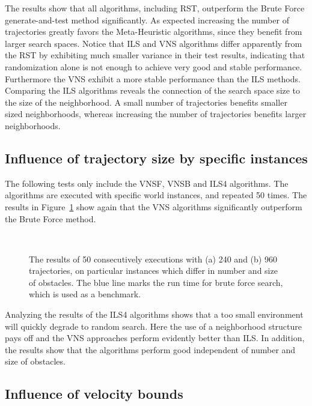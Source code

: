  
The results show that all algorithms, including RST, outperform the Brute Force generate-and-test method significantly. 
As expected increasing the number of trajectories greatly favors the Meta-Heuristic algorithms, since they benefit from larger search spaces. 
Notice that ILS and VNS algorithms differ apparently from the RST by exhibiting much smaller variance in their test results, indicating that randomization alone is not enough to achieve very good and stable performance.
Furthermore the VNS exhibit a more stable performance than the ILS methods. 
Comparing the ILS algorithms reveals the connection of the search space size to the size of the neighborhood. 
A small number of trajectories benefits smaller sized neighborhoods, whereas increasing the number of trajectories benefits larger neighborhoods. 

\subsection{Influence of trajectory size by specific instances}
The following tests only include the VNSF, VNSB and ILS4 algorithms. 
The algorithms are executed with specific world instances, and repeated 50 times. 
The results in Figure~\ref{fig:fig_special} show again that the VNS algorithms significantly outperform the Brute Force method. 

\begin{figure}[thb]
   \myfloatalign
    \subfloat[]
    {  
       \def\svgwidth{\textwidth}
       
    }\\
    \subfloat[]
    {  
       \def\svgwidth{\textwidth}
       
    }
    \caption[Experiment: Trajectory size comparison]{The results of 50 consecutively executions with (a) 240 and (b) 960 trajectories, on particular instances which differ in number and size of obstacles. The blue line marks the run time for brute force search, which is used as a benchmark.}  
     \label{fig:fig_special}
\end{figure}
   
Analyzing the results of the ILS4 algorithms shows that a too small environment will quickly degrade to random search. 
Here the use of a neighborhood structure pays off and the VNS approaches perform evidently better than ILS. 
In addition, the results show that the algorithms perform good independent of number and size of obstacles.

\subsection{Influence of velocity bounds}

